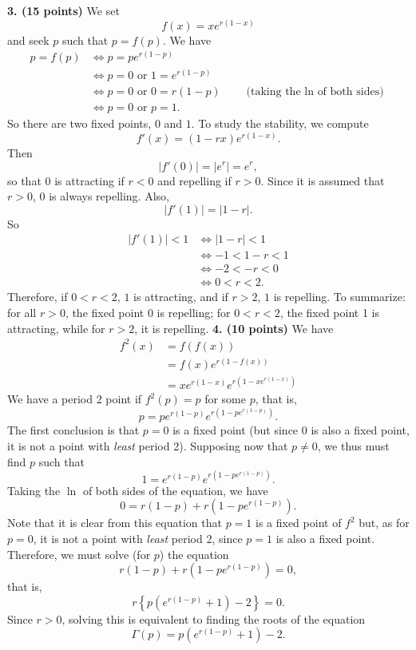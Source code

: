 \documentclass[12pt]{article}
\theoremstyle{plain}
\begin{document}
\vskip0.4cm
\noindent
{\bf 3. (15 points)} 
We set
\[
f(x)=xe^{r(1-x)}
\]
and seek $p$ such that $p=f(p)$. We have
\begin{align*}
p=f(p) &\Leftrightarrow p=pe^{r(1-p)} \\
&\Leftrightarrow p=0\textrm{ or }1=e^{r(1-p)} \\
&\Leftrightarrow p=0\textrm{ or }0=r(1-p)\qquad\textrm{(taking the $\ln$ of both sides)} \\
&\Leftrightarrow p=0\textrm{ or }p=1.
\end{align*}
So there are two fixed points, $0$ and $1$. To study the stability, we compute
\[
f'(x)=(1-rx)e^{r(1-x)}.
\]
Then
\[
|f'(0)|=|e^r|=e^r,
\]
so that $0$ is attracting if $r<0$ and repelling if $r>0$. Since it is assumed that $r>0$, $0$ is always repelling.
Also,
\[
|f'(1)|=|1-r|.
\]
So
\begin{align*}
|f'(1)|<1 &\Leftrightarrow |1-r|<1 \\
&\Leftrightarrow -1<1-r<1 \\
&\Leftrightarrow -2<-r<0 \\
&\Leftrightarrow 0<r<2.
\end{align*}
Therefore, if $0<r<2$, $1$ is attracting, and if $r>2$, $1$ is repelling.
\vskip0.2cm\noindent
To summarize: for all $r>0$, the fixed point 0 is repelling; for $0<r<2$, the fixed point 1 is attracting, while for $r>2$, it is repelling.
\vskip0.4cm
\noindent
{\bf 4. (10 points)} 
We have
\begin{align*}
f^2(x) &= f(f(x)) \\
&= f(x)e^{r(1-f(x))} \\
&= xe^{r(1-x)}e^{r(1-xe^{r(1-x)})}
\end{align*}
We have a period 2 point if $f^2(p)=p$ for some $p$, that is,
\[
p=pe^{r(1-p)}e^{r(1-pe^{r(1-p)})}.
\]
The first conclusion is that $p=0$ is a fixed point (but since 0 is also a fixed
point, it is not a point with \emph{least} period 2). Supposing now that $p\neq
0$, we thus must find $p$ such that
\[
1=e^{r(1-p)}e^{r(1-pe^{r(1-p)})}.
\]
Taking the $\ln$ of both sides of the equation, we have
\[
0=r(1-p)+r\left(1-pe^{r(1-p)}\right).
\]
Note that it is clear from this equation that $p=1$ is a fixed point of $f^2$
but, as for $p=0$, it is not a point with \emph{least} period 2, since $p=1$ is
also a fixed point.
Therefore, we must solve (for $p$) the equation
\[
r(1-p)+r(1-pe^{r(1-p)})=0,
\]
that is,
\[
r\left\{p\left(e^{r(1-p)}+1\right)-2\right\}=0.
\]
Since $r>0$, solving this is equivalent to finding the roots of the equation
\begin{equation}\label{eq:Gamma}
\Gamma(p)=p\left(e^{r(1-p)}+1\right)-2.
\end{equation}
\end{document}
